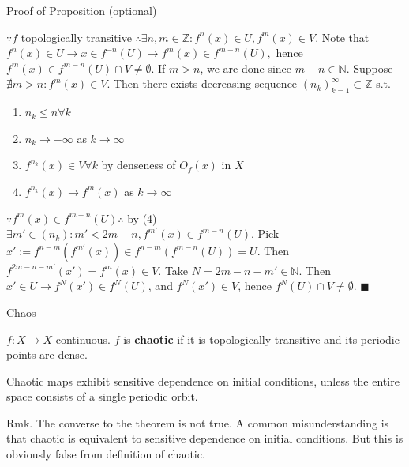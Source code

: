 \documentclass[aspectratio=169]{beamer}
\begin{document}
\begin{frame}{Proof of Proposition (optional)}
    \begin{pf}
        $\because f$ topologically transitive $\therefore\exists n,m\in\mathbb{Z}:f^n(x)\in U, f^m(x)\in V$. Note that $f^n(x)\in U \rightarrow x\in f^{-n}(U) \rightarrow f^m(x) \in f^{m-n}(U),$ hence $f^m(x) \in f^{m-n}(U) \cap V \neq \emptyset$. If $m>n$, we are done since $m-n\in \mathbb{N}$.
        Suppose $\nexists m>n:f^m(x)\in V$. Then there exists decreasing sequence $(n_k)_{k=1}^\infty \subset \mathbb{Z}$ s.t. 
        \begin{enumerate}
        \item $n_k \leq n \forall k$
        \item $n_k \rightarrow -\infty$ as $k\rightarrow \infty$
        \item $f^{n_k}(x)\in V \forall k$ by denseness of $O_f(x)$ in $X$
        \item $f^{n_k}(x) \rightarrow f^m(x)$ as $k\rightarrow \infty$
        \end{enumerate}
        $\because f^m(x) \in f^{m-n}(U) \therefore$ by (4) $\exists m' \in (n_k) : m' < 2m-n, f^{m'}(x) \in f^{m-n}(U)$. Pick $x':=f^{n-m}(f^{m'}(x)) \in f^{n-m}(f^{m-n}(U))=U$. Then $f^{2m-n-m'}(x')=f^m(x)\in V$. Take $N=2m-n-m'\in \mathbb{N}$. Then $x'\in U\rightarrow f^N(x')\in f^N(U)$, and $f^N(x')\in V$, hence $f^N(U) \cap V \neq \emptyset$. $\blacksquare$
        
    \end{pf}
\end{frame}

\begin{frame}{Chaos}
    \begin{defn}[Devaney]
        $f:X\rightarrow X$ continuous. $f$ is \textbf{chaotic} if it is topologically transitive and its periodic points are dense. 
    \end{defn}
    \begin{thrm}
        Chaotic maps exhibit sensitive dependence on initial conditions, unless the entire space consists of a single periodic orbit. 
    \end{thrm}
   Rmk. The converse to the theorem is not true. A common misunderstanding is that chaotic is equivalent to sensitive dependence on initial conditions. But this is obviously false from definition of chaotic. 
\end{frame}
\end{document}
